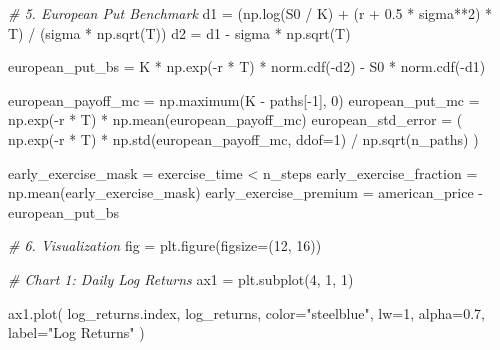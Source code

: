 \documentclass[
  11pt,
]{article}
\newenvironment{Shaded}{}{}
\newcommand{\CommentTok}[1]{\textcolor[rgb]{0.38,0.63,0.69}{\textit{#1}}}
\newcommand{\DecValTok}[1]{\textcolor[rgb]{0.25,0.63,0.44}{#1}}
\newcommand{\FloatTok}[1]{\textcolor[rgb]{0.25,0.63,0.44}{#1}}
\newcommand{\NormalTok}[1]{#1}
\newcommand{\OperatorTok}[1]{\textcolor[rgb]{0.40,0.40,0.40}{#1}}
\newcommand{\StringTok}[1]{\textcolor[rgb]{0.25,0.44,0.63}{#1}}
\begin{document}
\begin{Shaded}
\begin{Highlighting}[]
\CommentTok{\# 5. European Put Benchmark}
\NormalTok{d1 }\OperatorTok{=}\NormalTok{ (np.log(S0 }\OperatorTok{/}\NormalTok{ K) }\OperatorTok{+}\NormalTok{ (r }\OperatorTok{+} \FloatTok{0.5} \OperatorTok{*}\NormalTok{ sigma}\OperatorTok{**}\DecValTok{2}\NormalTok{) }\OperatorTok{*}\NormalTok{ T) }\OperatorTok{/}\NormalTok{ (sigma }\OperatorTok{*}\NormalTok{ np.sqrt(T))}
\NormalTok{d2 }\OperatorTok{=}\NormalTok{ d1 }\OperatorTok{{-}}\NormalTok{ sigma }\OperatorTok{*}\NormalTok{ np.sqrt(T)}

\NormalTok{european\_put\_bs }\OperatorTok{=}\NormalTok{ K }\OperatorTok{*}\NormalTok{ np.exp(}\OperatorTok{{-}}\NormalTok{r }\OperatorTok{*}\NormalTok{ T) }\OperatorTok{*}\NormalTok{ norm.cdf(}\OperatorTok{{-}}\NormalTok{d2) }\OperatorTok{{-}}\NormalTok{ S0 }\OperatorTok{*}\NormalTok{ norm.cdf(}\OperatorTok{{-}}\NormalTok{d1)}

\NormalTok{european\_payoff\_mc }\OperatorTok{=}\NormalTok{ np.maximum(K }\OperatorTok{{-}}\NormalTok{ paths[}\OperatorTok{{-}}\DecValTok{1}\NormalTok{], }\DecValTok{0}\NormalTok{)}
\NormalTok{european\_put\_mc }\OperatorTok{=}\NormalTok{ np.exp(}\OperatorTok{{-}}\NormalTok{r }\OperatorTok{*}\NormalTok{ T) }\OperatorTok{*}\NormalTok{ np.mean(european\_payoff\_mc)}
\NormalTok{european\_std\_error }\OperatorTok{=}\NormalTok{ (}
\NormalTok{    np.exp(}\OperatorTok{{-}}\NormalTok{r }\OperatorTok{*}\NormalTok{ T)}
    \OperatorTok{*}\NormalTok{ np.std(european\_payoff\_mc, ddof}\OperatorTok{=}\DecValTok{1}\NormalTok{)}
    \OperatorTok{/}\NormalTok{ np.sqrt(n\_paths)}
\NormalTok{)}

\NormalTok{early\_exercise\_mask }\OperatorTok{=}\NormalTok{ exercise\_time }\OperatorTok{\textless{}}\NormalTok{ n\_steps}
\NormalTok{early\_exercise\_fraction }\OperatorTok{=}\NormalTok{ np.mean(early\_exercise\_mask)}
\NormalTok{early\_exercise\_premium }\OperatorTok{=}\NormalTok{ american\_price }\OperatorTok{{-}}\NormalTok{ european\_put\_bs}

\CommentTok{\# 6. Visualization}
\NormalTok{fig }\OperatorTok{=}\NormalTok{ plt.figure(figsize}\OperatorTok{=}\NormalTok{(}\DecValTok{12}\NormalTok{, }\DecValTok{16}\NormalTok{))}

\CommentTok{\# Chart 1: Daily Log Returns}
\NormalTok{ax1 }\OperatorTok{=}\NormalTok{ plt.subplot(}\DecValTok{4}\NormalTok{, }\DecValTok{1}\NormalTok{, }\DecValTok{1}\NormalTok{)}

\NormalTok{ax1.plot(}
\NormalTok{    log\_returns.index,}
\NormalTok{    log\_returns,}
\NormalTok{    color}\OperatorTok{=}\StringTok{"steelblue"}\NormalTok{,}
\NormalTok{    lw}\OperatorTok{=}\DecValTok{1}\NormalTok{,}
\NormalTok{    alpha}\OperatorTok{=}\FloatTok{0.7}\NormalTok{,}
\NormalTok{    label}\OperatorTok{=}\StringTok{"Log Returns"}
\NormalTok{)}


\end{Highlighting}
\end{Shaded}
\end{document}
